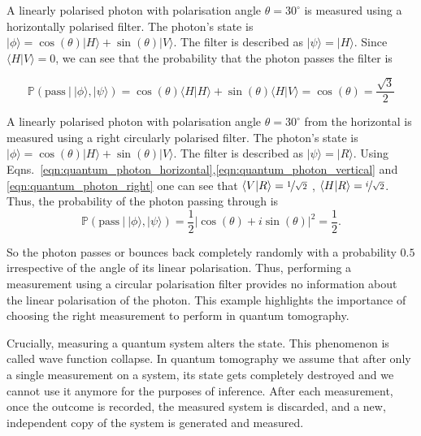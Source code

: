 \begin{example}
A linearly polarised photon with polarisation angle $\theta = 30^{\circ}$	 is measured using a horizontally polarised filter. The photon's state is $\vert\phi\rangle = \cos(\theta)\vert H \rangle + \sin(\theta)\vert V \rangle$. The filter is described as $\vert\psi\rangle = \vert H \rangle$. Since $\langle H \vert V \rangle = 0$, we can see that the probability that the photon passes the filter is

\begin{equation}
	\mathbb{P}\left( \mbox{pass}\ \vert\ \vert\phi\rangle , \vert\psi\rangle \right) = \cos(\theta)\langle H \vert H \rangle + \sin(\theta) \langle H \vert V \rangle = \cos(\theta) = \frac{\sqrt{3}}{2}
\end{equation}\end{example}

\begin{example}
A linearly polarised photon with polarisation angle $\theta = 30^{\circ}$ from the horizontal is measured using a right circularly polarised filter. The photon's state is $\vert\phi\rangle = \cos(\theta)\vert H \rangle + \sin(\theta)\vert V \rangle$. The filter is described as $\vert\psi\rangle = \vert R \rangle$. Using Eqns.\ \eqref{eqn:quantum_photon_horizontal},\eqref{eqn:quantum_photon_vertical} and \eqref{eqn:quantum_photon_right} one can see that $\langle V \vert R \rangle = \nicefrac{1}{\sqrt{2}}$ , $\langle H \vert R \rangle = \nicefrac{i}{\sqrt{2}}$. Thus, the probability of the photon passing through is
\begin{equation}
	\mathbb{P}\left( \mbox{pass}\ \vert\ \vert\phi\rangle , \vert\psi\rangle \right) = \frac{1}{2}\left\vert\cos(\theta) + i\sin(\theta)\right\vert^2 = \frac{1}{2}.
\end{equation}

So the photon passes or bounces back completely randomly with a probability $0.5$ irrespective of the angle of its linear polarisation. Thus, performing a measurement using a circular polarisation filter provides no information about the linear polarisation of the photon. This example highlights the importance of choosing the right measurement to perform in quantum tomography.
\end{example}

Crucially, measuring a quantum system alters the state.	This phenomenon is called wave function collapse. In quantum tomography we assume that after only a single measurement on a system, its state gets completely destroyed and we cannot use it anymore for the purposes of inference. After each measurement, once the outcome is recorded, the measured system is discarded, and a new, independent copy of the system is generated and measured.

